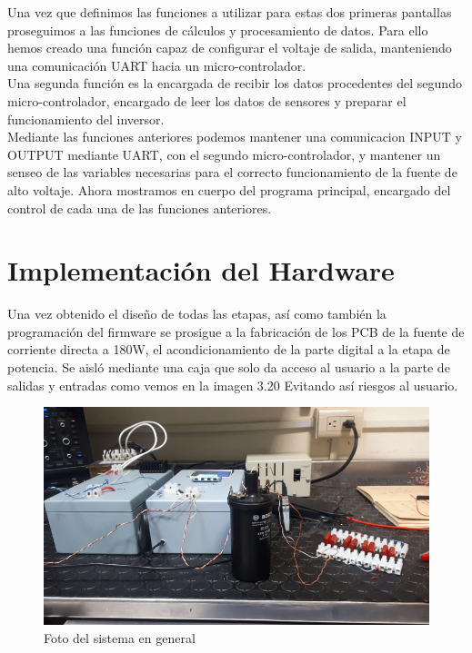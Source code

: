 Una vez que definimos las funciones a utilizar para estas dos primeras pantallas proseguimos a las funciones de cálculos y procesamiento de datos. Para ello hemos creado una función capaz de configurar el voltaje de salida, manteniendo una comunicación UART hacia un micro-controlador. \\

Una segunda función es la encargada de recibir los datos procedentes del segundo micro-controlador, encargado de leer los datos de sensores y preparar el funcionamiento del inversor. \\


Mediante las funciones anteriores podemos mantener una comunicacion INPUT y OUTPUT mediante UART, con el segundo micro-controlador, y mantener un senseo de las variables necesarias para el correcto funcionamiento de la fuente de alto voltaje. Ahora mostramos en cuerpo del programa principal, encargado del control de cada una de las funciones anteriores.

\section{Implementación del Hardware}

Una vez obtenido el diseño de todas las etapas, así como también la programación del firmware se prosigue a la fabricación de los PCB de la fuente de corriente directa a 180W, el acondicionamiento de la parte digital a la etapa de potencia. Se aisló mediante una caja que solo da acceso al usuario a la parte de salidas y entradas como vemos en la imagen 3.20 Evitando así riesgos al usuario. \\


\begin{figure}[H]
\centering
\includegraphics[width=12cm]{Capitulo3/figs/noimagen.png}
\caption{Foto del sistema en general}
\end{figure}

